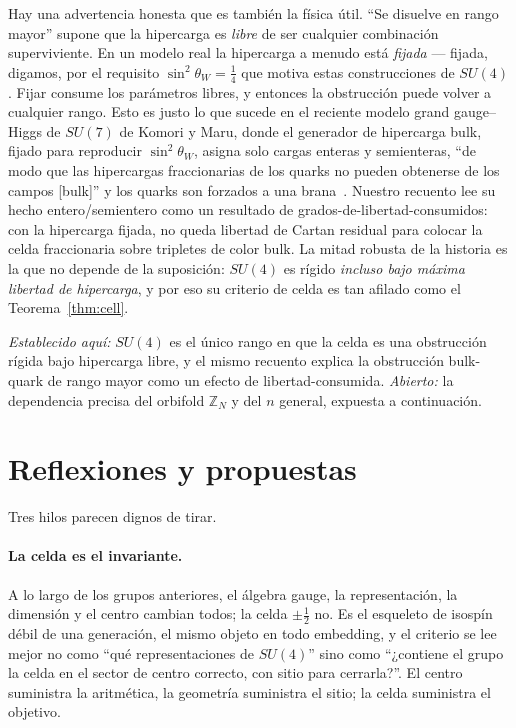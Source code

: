 \documentclass[11pt,a4paper]{article}
\newcommand{\ZZ}{\mathbb{Z}}
\begin{document}
Hay una advertencia honesta que es también la física útil. ``Se disuelve en rango mayor''
supone que la hipercarga es \emph{libre} de ser cualquier combinación superviviente. En un
modelo real la hipercarga a menudo está \emph{fijada} --- fijada, digamos, por el requisito
$\sin^2\theta_W=\tfrac14$ que motiva estas construcciones de $SU(4)$. Fijar consume los
parámetros libres, y entonces la obstrucción puede volver a cualquier rango. Esto es justo lo
que sucede en el reciente modelo grand gauge--Higgs de $SU(7)$ de Komori y Maru, donde el
generador de hipercarga bulk, fijado para reproducir $\sin^2\theta_W$, asigna solo cargas
enteras y semienteras, ``de modo que las hipercargas fraccionarias de los quarks no pueden
obtenerse de los campos [bulk]'' y los quarks son forzados a una brana~\cite{KomoriMaru}.
Nuestro recuento lee su hecho entero/semientero como un resultado de
grados-de-libertad-consumidos: con la hipercarga fijada, no queda libertad de Cartan residual
para colocar la celda fraccionaria sobre tripletes de color bulk. La mitad robusta de la
historia es la que no depende de la suposición: $SU(4)$ es rígido \emph{incluso bajo máxima
libertad de hipercarga}, y por eso su criterio de celda es tan afilado como el
Teorema~\ref{thm:cell}.

\emph{Establecido aquí:} $SU(4)$ es el único rango en que la celda es una obstrucción rígida
bajo hipercarga libre, y el mismo recuento explica la obstrucción bulk-quark de rango mayor
como un efecto de libertad-consumida. \emph{Abierto:} la dependencia precisa del orbifold
$\ZZ_N$ y del $n$ general, expuesta a continuación.

\section{Reflexiones y propuestas}\label{sec:reflections}
Tres hilos parecen dignos de tirar.

\paragraph{La celda es el invariante.} A lo largo de los grupos anteriores, el álgebra gauge, la
representación, la dimensión y el centro cambian todos; la celda $\pm\tfrac12$ no. Es el
esqueleto de isospín débil de una generación, el mismo objeto en todo embedding, y el criterio
se lee mejor no como ``qué representaciones de $SU(4)$'' sino como ``¿contiene el grupo la celda
en el sector de centro correcto, con sitio para cerrarla?''. El centro suministra la aritmética,
la geometría suministra el sitio; la celda suministra el objetivo.
\end{document}
